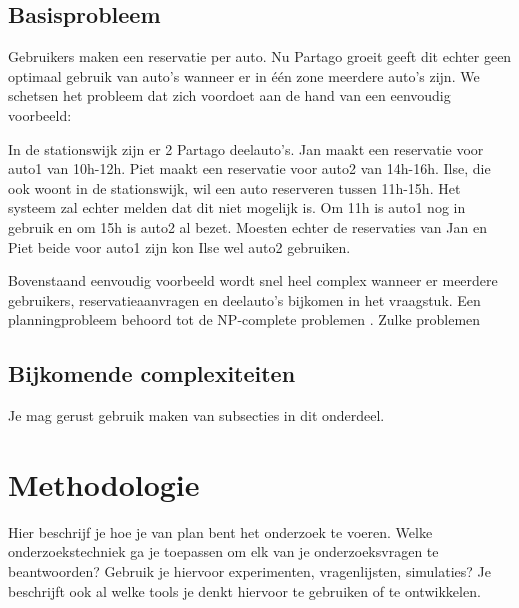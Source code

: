 \subsection{Basisprobleem}
Gebruikers maken een reservatie per auto. Nu Partago groeit geeft dit echter geen optimaal gebruik van auto's wanneer er in één zone meerdere auto's zijn. 
We schetsen het probleem dat zich voordoet aan de hand van een eenvoudig voorbeeld: 

In de stationswijk zijn er 2 Partago deelauto's. Jan maakt een reservatie voor auto1 van 10h-12h. Piet maakt een reservatie voor auto2 van 14h-16h. Ilse, die ook woont in de stationswijk, wil een auto reserveren tussen 11h-15h. Het systeem zal echter melden dat dit niet mogelijk is. Om 11h is auto1 nog in gebruik en om 15h is auto2 al bezet. Moesten echter de reservaties van Jan en Piet beide voor auto1 zijn kon Ilse wel auto2 gebruiken.

Bovenstaand eenvoudig voorbeeld wordt snel heel complex wanneer er meerdere gebruikers, reservatieaanvragen en deelauto's bijkomen in het vraagstuk.
Een planningprobleem behoord tot de NP-complete problemen \autocite{negnevitsky}. Zulke problemen 

\subsection{Bijkomende complexiteiten}



Je mag gerust gebruik maken van subsecties in dit onderdeel.

\section{Methodologie}
\label{sec:methodologie}

Hier beschrijf je hoe je van plan bent het onderzoek te voeren. Welke onderzoekstechniek ga je toepassen om elk van je onderzoeksvragen te beantwoorden? Gebruik je hiervoor experimenten, vragenlijsten, simulaties? Je beschrijft ook al welke tools je denkt hiervoor te gebruiken of te ontwikkelen.

